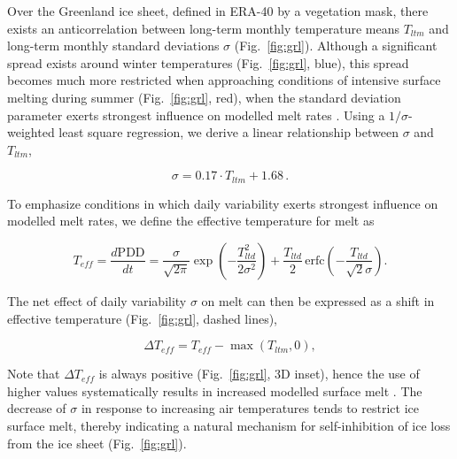\documentclass[review]{igs}
\begin{document}
Over the Greenland ice sheet, defined in ERA-40 by a vegetation mask, there exists an anticorrelation between long-term monthly temperature means $T_{ltm}$ and long-term monthly standard deviations $\sigma$ (Fig.~\ref{fig:grl}). Although a significant spread exists around winter temperatures (Fig.~\ref{fig:grl}, blue), this spread becomes much more restricted when approaching conditions of intensive surface melting during summer (Fig.~\ref{fig:grl}, red), when the standard deviation parameter exerts strongest influence on modelled melt rates \citep{rogozhina-rau-inpress}. Using a $1/\sigma$-weighted least square regression, we derive a linear relationship between $\sigma$ and $T_{ltm}$,

\begin{equation} \label{eq:sigma}
    \sigma = 0.17 \cdot T_{ltm} + 1.68\,.
\end{equation}

To emphasize conditions in which daily variability exerts strongest influence on modelled melt rates, we define the effective temperature for melt as

\begin{equation} \label{eq:teff}
    T_{eff} = \frac{d\mathrm{PDD}}{dt}
        = \frac{\sigma}{\sqrt{2\pi}} \exp\left({-\frac{T_{ltd}^2}{2\sigma^2}}\right)
            + \frac{T_{ltd}}{2} \, \mathrm{erfc} \left(-\frac{T_{ltd}}{\sqrt{2}\sigma}\right).
\end{equation}

The net effect of daily variability $\sigma$ on melt can then be expressed as a shift in effective temperature (Fig.~\ref{fig:grl}, dashed lines),

\begin{equation} \label{eq:dteff}
    \Delta T_{eff} = T_{eff} - \max(T_{ltm}, 0),
\end{equation}

Note that $\Delta T_{eff}$ is always positive (Fig.~\ref{fig:grl}, 3D inset), hence the use of higher values systematically results in increased modelled surface melt \citep{rogozhina-rau-inpress}. The decrease of $\sigma$ in response to increasing air temperatures tends to restrict ice surface melt, thereby indicating a natural mechanism for self-inhibition of ice loss from the ice sheet (Fig.~\ref{fig:grl}).
\end{document}
